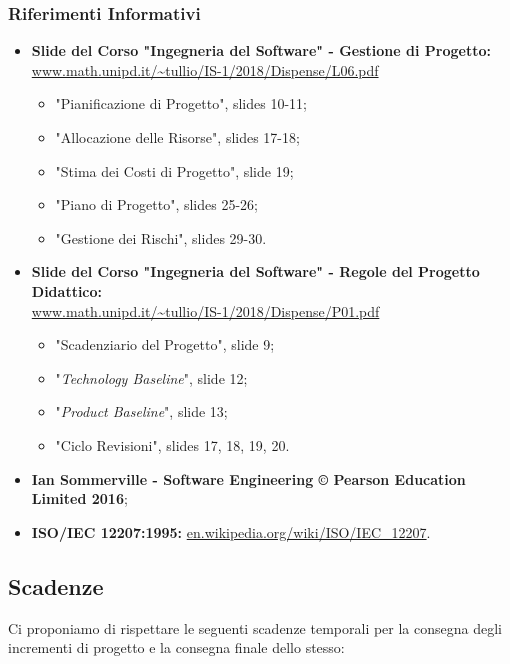 \subsubsection{Riferimenti Informativi}
\begin{itemize}
	\item \textbf{Slide del Corso "Ingegneria del Software" - Gestione di Progetto:}\-\\ \url{www.math.unipd.it/~tullio/IS-1/2018/Dispense/L06.pdf}
	\begin{itemize}
		\item "Pianificazione di Progetto", slides 10-11; 
		\item "Allocazione delle Risorse", slides 17-18;
		\item "Stima dei Costi di Progetto", slide 19;
		\item "Piano di Progetto", slides 25-26;
		\item "Gestione dei Rischi", slides 29-30.
	\end{itemize}
	\item \textbf{Slide del Corso "Ingegneria del Software" - Regole del Progetto Didattico:}\-\\ \url{www.math.unipd.it/~tullio/IS-1/2018/Dispense/P01.pdf}
		\begin{itemize}
			\item "Scadenziario del Progetto", slide 9;
			\item "\textit{Technology Baseline}", slide 12;
			\item "\textit{Product Baseline}", slide 13;
			\item "Ciclo Revisioni", slides 17, 18, 19, 20. 
		\end{itemize}
	\item \textbf{Ian Sommerville - Software Engineering © Pearson Education Limited 2016};
	\item \textbf{ISO/IEC 12207:1995:} \url{en.wikipedia.org/wiki/ISO/IEC_12207}.
\end{itemize}




\newpage

\subsection{Scadenze}
Ci proponiamo di rispettare le seguenti scadenze temporali per la consegna degli incrementi di progetto e la consegna finale dello stesso:


